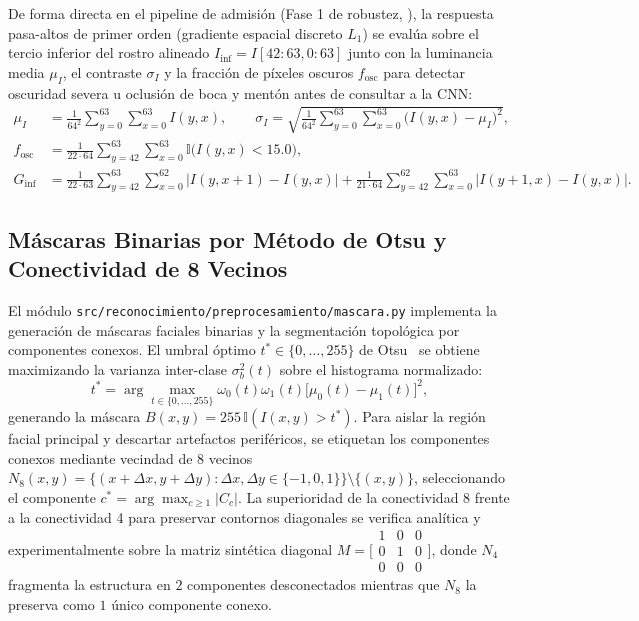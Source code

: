 \documentclass{article}
\begin{document}
De forma directa en el pipeline de admisión (Fase 1 de robustez, ), la respuesta pasa-altos de primer orden (gradiente espacial discreto $L_1$) se evalúa sobre el tercio inferior del rostro alineado $I_{\text{inf}} = I[42:63, 0:63]$ junto con la luminancia media $\mu_I$, el contraste $\sigma_I$ y la fracción de píxeles oscuros $f_{\text{osc}}$ para detectar oscuridad severa u oclusión de boca y mentón antes de consultar a la CNN:
\begin{align}
\mu_I &= \frac{1}{64^2} \sum_{y=0}^{63} \sum_{x=0}^{63} I(y,x), \qquad
\sigma_I = \sqrt{\frac{1}{64^2} \sum_{y=0}^{63} \sum_{x=0}^{63} \bigl(I(y,x) - \mu_I\bigr)^2}, \\
f_{\text{osc}} &= \frac{1}{22 \cdot 64} \sum_{y=42}^{63} \sum_{x=0}^{63} \mathbb{I}\bigl(I(y,x) < 15.0\bigr), \\
G_{\text{inf}} &= \frac{1}{22 \cdot 63} \sum_{y=42}^{63} \sum_{x=0}^{62} \bigl|I(y, x+1) - I(y, x)\bigr|
+ \frac{1}{21 \cdot 64} \sum_{y=42}^{62} \sum_{x=0}^{63} \bigl|I(y+1, x) - I(y, x)\bigr|.
\label{eq:metricas_calidad}
\end{align}

\subsection{Máscaras Binarias por Método de Otsu y Conectividad de 8 Vecinos}
El módulo \texttt{src/reconocimiento/preprocesamiento/mascara.py} implementa la generación de máscaras faciales binarias y la segmentación topológica por componentes conexos. El umbral óptimo $t^* \in \{0,\dots,255\}$ de Otsu~\cite{otsu1979threshold} se obtiene maximizando la varianza inter-clase $\sigma_b^2(t)$ sobre el histograma normalizado:
\begin{equation}
t^* = \arg\max_{t \in \{0,\dots,255\}} \omega_0(t)\omega_1(t)\bigl[\mu_0(t) - \mu_1(t)\bigr]^2,
\label{eq:otsu}
\end{equation}
generando la máscara $B(x,y) = 255\,\mathbb{I}(I(x,y) > t^*)$. Para aislar la región facial principal y descartar artefactos periféricos, se etiquetan los componentes conexos mediante vecindad de 8 vecinos $N_8(x,y) = \{(x+\Delta x, y+\Delta y) : \Delta x, \Delta y \in \{-1,0,1\}\} \setminus \{(x,y)\}$, seleccionando el componente $c^* = \arg\max_{c \ge 1} |C_c|$. La superioridad de la conectividad 8 frente a la conectividad 4 para preservar contornos diagonales se verifica analítica y experimentalmente sobre la matriz sintética diagonal $M = \bigl[\begin{smallmatrix} 1 & 0 & 0 \\ 0 & 1 & 0 \\ 0 & 0 & 0 \end{smallmatrix}\bigr]$, donde $N_4$ fragmenta la estructura en $2$ componentes desconectados mientras que $N_8$ la preserva como $1$ único componente conexo.
\end{document}
